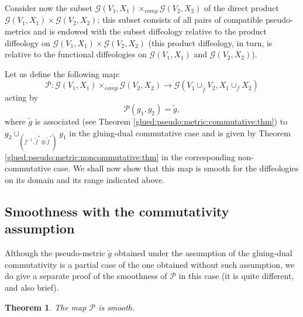 \documentclass{article}
\newtheorem{thm}[lemma]{Theorem}
\begin{document}
Consider now the subset $\mathcal{G}(V_1,X_1)\times_{comp}\mathcal{G}(V_2,X_2)$ of the direct product $\mathcal{G}(V_1,X_1)\times\mathcal{G}(V_2,X_2)$; this subset consists of all pairs of compatible 
pseudo-metrics and is endowed with the subset diffeology relative to the product diffeology on $\mathcal{G}(V_1,X_1)\times\mathcal{G}(V_2,X_2)$ (this product diffeology, in turn, is relative to the functional
diffeologies on $\mathcal{G}(V_1,X_1)$ and $\mathcal{G}(V_2,X_2)$).

Let us define the following map:
$$\mathcal{P}:\mathcal{G}(V_1,X_1)\times_{comp}\mathcal{G}(V_2,X_2)\to\mathcal{G}(V_1\cup_{\tilde{f}}V_2,X_1\cup_f X_2)$$ acting by
$$\mathcal{P}(g_1,g_2)=\tilde{g},$$ where $\tilde{g}$ is associated (see Theorem \ref{glued:pseudo:metric:commutative:thm}) to $g_2\cup_{(f^{-1},\tilde{f}^*\otimes\tilde{f}^*)}g_1$ in the gluing-dual 
commutative case and is given by Theorem \ref{glued:pseudo:metric:noncommutative:thm} in the corresponding non-commutative case. We shall now show that this map is smooth for the diffeologies on its 
domain and its range indicated above.


\subsection{Smoothness with the commutativity assumption}

Although the pseudo-metric $\tilde{g}$ obtained under the assumption of the gluing-dual commutativity is a partial case of the one obtained without such assumption, we do give a separate proof of the
smoothness of $\mathcal{P}$ in this case (it is quite different, and also brief).

\begin{thm}
The map $\mathcal{P}$ is smooth.
\end{thm}
\end{document}

